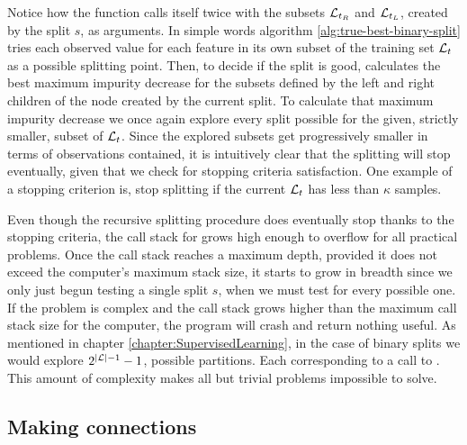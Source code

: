 Notice how the function \TrueBestSplit calls itself twice with the subsets
$\mathcal{L}_{t_R}$ and $\mathcal{L}_{t_L}$, created by the split $s$, as arguments. In simple words
algorithm \ref{alg:true-best-binary-split} tries each observed value for each
feature in its own subset of the training set $\mathcal{L}_t$ as a possible splitting
point. Then, to decide if the split is good, calculates the best maximum
impurity decrease for the subsets defined by the left and right children of the
node created by the current split. To calculate that maximum impurity decrease
we once again explore every split possible for the given, strictly smaller,
subset of $\mathcal{L}_t$. Since the explored subsets get progressively smaller in terms
of observations contained, it is intuitively clear that the splitting will stop
eventually, given that we check for stopping criteria satisfaction. One example
of a stopping criterion is, stop splitting if the current $\mathcal{L}_t$ has less
than $\kappa$ samples.

Even though the recursive splitting procedure does eventually stop thanks to the
stopping criteria, the call stack for \TrueBestSplit grows high enough to
overflow for all practical problems. Once the call stack reaches a maximum
depth, provided it does not exceed the computer's maximum stack size, it starts
to grow in breadth since we only just begun testing a single split $s$, when we
must test for every possible one. If the problem is complex and the call stack
grows higher than the maximum call stack size for the computer, the program will
crash and return nothing useful. As mentioned in chapter
\ref{chapter:SupervisedLearning}, in the case of binary splits we would explore
$2^{|\mathcal{L}| -1}-1$, possible partitions.  Each corresponding to a call to
\TrueBestSplit. This amount of complexity makes all but trivial problems
impossible to solve. 

\subsection{Making connections}

